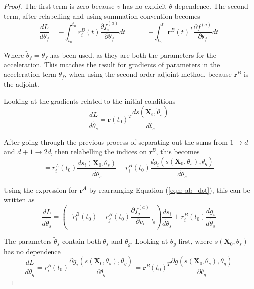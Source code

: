 \documentclass{article}
\theoremstyle{remark}
\theoremstyle{definition}
\begin{document}
\begin{proof}
The first term is zero because $v$ has no explicit $\theta$ dependence. The second term, after relabelling and using summation convention becomes
\begin{equation}
\frac{dL}{d\theta_{f}} = -\int_{t_{n}}^{t_{0}}
r^{B}_{i}(t)\frac{\partial f^{(a)}_{i}}{\partial \theta_{f}}dt
\qquad
= -\int_{t_{n}}^{t_{0}}
\mathbf{r}^{B}(t)^{T}\frac{\partial f^{(a)}}{\partial \theta_{f}}dt
\end{equation}

Where $\tilde{\theta}_{f} = \theta_{f}$ has been used, as they are both the parameters for the acceleration. This matches the result for gradients of parameters in the acceleration term $\theta_{f}$, when using the second order adjoint method, because $\mathbf{r}^{B}$ is the adjoint.

Looking at the gradients related to the initial conditions
\begin{equation}
\frac{dL}{d\tilde{\theta}_{s}} = \mathbf{r}(t_{0})^{T}\frac{d\tilde{s}(\mathbf{X}_{0}, \tilde{\theta}_{s})}{d\tilde{\theta}_{s}}
\end{equation}

After going through the previous process of separating out the sums from $1\xrightarrow{}d$ and $d+1 \xrightarrow{}2d$, then relabelling the indices on $\mathbf{r}^{B}$, this becomes
\begin{equation}
= r^{A}_{i}(t_{0})\frac{ds_{i}(\mathbf{X}_{0}, \theta_{s})}{d\tilde{\theta}_{s}}
+ r^{B}_{i}(t_{0})\frac{dg_{i}(s(\mathbf{X}_{0}, \theta_{s}), \theta_{g})}{d\tilde{\theta}_{s}}
\end{equation}

Using the expression for $\mathbf{r}^{A}$ by rearranging Equation (\ref{eqn: ab_dot}), this can be written as
\begin{equation}
\label{eqn: tilde_theta_s_grads}
\frac{dL}{d\tilde{\theta}_{s}}= 
\left(
-\dot{r}^{B}_{i}(t_{0}) - r^{B}_{j}(t_{0})\frac{\partial f^{(a)}_{j}}{\partial v_{i}}\Biggr\vert_{t_{0}}
\right)
\frac{ds_{i}}{d\tilde{\theta}_{s}}
+ r^{B}_{i}(t_{0})\frac{dg_{i}}{d\tilde{\theta}_{s}}
\end{equation}

The parameters $\tilde{\theta}_{s}$ contain both $\theta_{s}$ and $\theta_{g}$. Looking at $\theta_{g}$ first, where $s(\mathbf{X}_{0}, \theta_{s})$ has no dependence
\begin{equation}
    \frac{dL}{d\theta_{g}} = r^{B}_{i}(t_{0})\frac{\partial g_{i}(s(\mathbf{X}_{0}, \theta_{s}),\theta_{g})}{\partial \theta_{g}}
    =
    \mathbf{r}^{B}(t_{0})^{T}\frac{\partial g(s(\mathbf{X}_{0},\theta_{s}),\theta_{g})}{\partial \theta_{g}}
\end{equation}


\end{proof}
\end{document}
